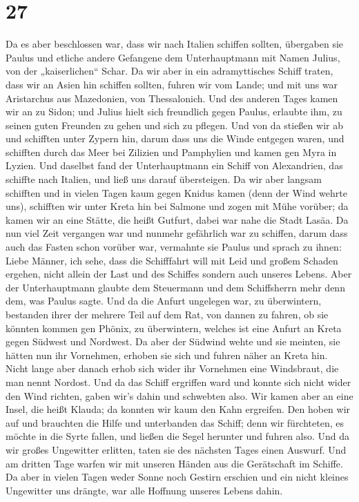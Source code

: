 \hypertarget{section-26}{%
\section{27}\label{section-26}}

 Da es aber beschlossen war, dass wir nach Italien
schiffen sollten, übergaben sie Paulus und etliche andere Gefangene dem
Unterhauptmann mit Namen Julius, von der „kaiserlichen`` Schar.
 Da wir aber in ein adramyttisches Schiff traten, dass wir
an Asien hin schiffen sollten, fuhren wir vom Lande; und mit uns war
Aristarchus aus Mazedonien, von Thessalonich.  Und des
anderen Tages kamen wir an zu Sidon; und Julius hielt sich freundlich
gegen Paulus, erlaubte ihm, zu seinen guten Freunden zu gehen und sich
zu pflegen.  Und von da stießen wir ab und schifften unter
Zypern hin, darum dass uns die Winde entgegen waren,  und
schifften durch das Meer bei Zilizien und Pamphylien und kamen gen Myra
in Lyzien.  Und daselbst fand der Unterhauptmann ein
Schiff von Alexandrien, das schiffte nach Italien, und ließ uns darauf
übersteigen.  Da wir aber langsam schifften und in vielen
Tagen kaum gegen Knidus kamen (denn der Wind wehrte uns), schifften wir
unter Kreta hin bei Salmone  und zogen mit Mühe vorüber;
da kamen wir an eine Stätte, die heißt Gutfurt, dabei war nahe die Stadt
Lasäa.  Da nun viel Zeit vergangen war und nunmehr
gefährlich war zu schiffen, darum dass auch das Fasten schon vorüber
war, vermahnte sie Paulus  und sprach zu ihnen: Liebe
Männer, ich sehe, dass die Schifffahrt will mit Leid und großem Schaden
ergehen, nicht allein der Last und des Schiffes sondern auch unseres
Lebens.  Aber der Unterhauptmann glaubte dem Steuermann
und dem Schiffsherrn mehr denn dem, was Paulus sagte. 
Und da die Anfurt ungelegen war, zu überwintern, bestanden ihrer der
mehrere Teil auf dem Rat, von dannen zu fahren, ob sie könnten kommen
gen Phönix, zu überwintern, welches ist eine Anfurt an Kreta gegen
Südwest und Nordwest.  Da aber der Südwind wehte und sie
meinten, sie hätten nun ihr Vornehmen, erhoben sie sich und fuhren näher
an Kreta hin.  Nicht lange aber danach erhob sich wider
ihr Vornehmen eine Windsbraut, die man nennt Nordost. 
Und da das Schiff ergriffen ward und konnte sich nicht wider den Wind
richten, gaben wir's dahin und schwebten also.  Wir kamen
aber an eine Insel, die heißt Klauda; da konnten wir kaum den Kahn
ergreifen.  Den hoben wir auf und brauchten die Hilfe und
unterbanden das Schiff; denn wir fürchteten, es möchte in die Syrte
fallen, und ließen die Segel herunter und fuhren also. 
Und da wir großes Ungewitter erlitten, taten sie des nächsten Tages
einen Auswurf.  Und am dritten Tage warfen wir mit
unseren Händen aus die Gerätschaft im Schiffe.  Da aber
in vielen Tagen weder Sonne noch Gestirn erschien und ein nicht kleines
Ungewitter uns drängte, war alle Hoffnung unseres Lebens dahin.

